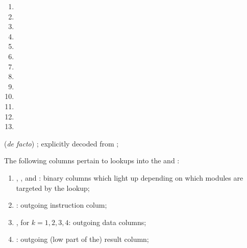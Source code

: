 \begin{enumerate}
\begin{multicols}{3}
\begin{enumerate}
				\item \oobInstIsModexpLead{}
				\item \oobInstIsModexpPricing{}
				\item \oobInstIsModexpExtract{}
				\item \oobInstIsPointEvaluation{}
				\item \oobInstIsBlsGOneAdd{}
				\item \oobInstIsBlsGOneMsm{}
				\item \oobInstIsBlsGTwoAdd{}
				\item \oobInstIsBlsGTwoMsm{}
				\item \oobInstIsBlsPairingCheck{}
				\item \oobInstIsBlsMapFpToGOne{}
				\item \oobInstIsBlsMapFpTwoToGTwo{}
				\item \oobInstIsPVerify{}
				\item[\vspace{\fill}]
			\end{enumerate}
		\end{multicols}
		(\emph{de facto}) \ccbc{}; explicitly decoded from ;
\end{enumerate}
The following columns pertain to lookups into the \wcpMod{} and \addMod{}:
\begin{enumerate}[resume]
	\item
		\wcpFlag{},
		\addFlag{},
		\modFlag{} and
		\blsRefTableFlag{}:
		binary columns which light up depending on which modules are targeted by the lookup;
	\item \outgoingInst{}:
		outgoing instruction colum;
	\item {}, for $k = 1, 2, 3, 4$:
		outgoing data columns;
	\item \outgoingResLo{}:
		outgoing (low part of the) result column;
\end{enumerate}
